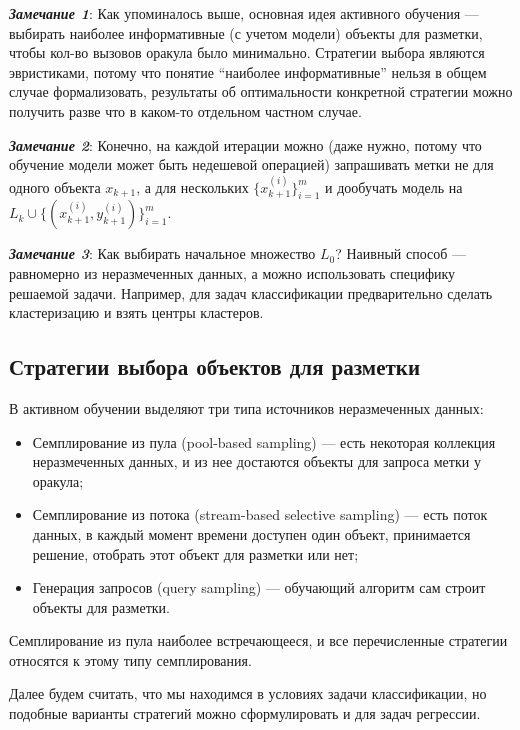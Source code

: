 \documentclass[specialist, 12pt, href]{article}
\begin{document}
\emph{\textbf{Замечание 1}}:
Как упоминалось выше, основная идея
активного обучения --- выбирать наиболее информативные (с учетом
модели) объекты для разметки, чтобы кол-во вызовов оракула было
минимально. Стратегии выбора являются эвристиками,
потому что понятие ``наиболее информативные'' нельзя в общем случае
формализовать, результаты об оптимальности конкретной стратегии можно
получить разве что в каком-то отдельном частном случае.

\emph{\textbf{Замечание 2}}: Конечно, на каждой итерации можно (даже
нужно, потому что обучение модели может быть недешевой операцией)
запрашивать метки не для одного объекта \(x_{k + 1}\), а для нескольких
\(\{x_{k + 1}^{(i)}\}_{i = 1}^{m}\) и дообучать модель на
\(L_{k} \cup \{(x_{k + 1}^{(i)}, y_{k + 1}^{(i)})\}_{i = 1}^{m}\).

\emph{\textbf{Замечание 3}}: Как выбирать начальное множество \(L_0\)?
Наивный способ --- равномерно из неразмеченных данных, а можно
использовать специфику решаемой задачи. Например, для задач
классификации предварительно сделать кластеризацию и взять центры
кластеров.

\subsection{Стратегии выбора объектов для
разметки}

В активном обучении выделяют три типа источников неразмеченных данных:

\begin{itemize}
\item
  Семплирование из пула (pool-based sampling) --- есть некоторая
  коллекция неразмеченных данных, и из нее достаются объекты для запроса
  метки у оракула;
\item
  Семплирование из потока (stream-based selective sampling) --- есть
  поток данных, в каждый момент времени доступен один объект,
  принимается решение, отобрать этот объект для разметки или нет;
\item
  Генерация запросов (query sampling) --- обучающий алгоритм сам строит
  объекты для разметки.
\end{itemize}

Семплирование из пула наиболее встречающееся, и все перечисленные
стратегии относятся к этому типу семплирования.

Далее будем считать, что мы находимся в условиях задачи классификации,
но подобные варианты стратегий можно сформулировать и для задач
регрессии.
\end{document}
